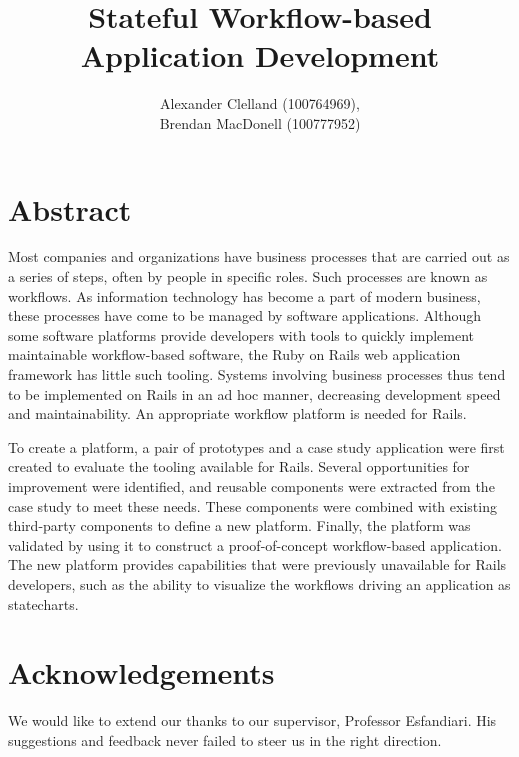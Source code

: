 \documentclass[document.tex]{subfiles}
\begin{document}
\title{Stateful Workflow-based\\Application Development}
\author{
  Alexander Clelland (100764969), \\
  Brendan MacDonell (100777952)
}
\copyrightfalse %

\beforepreface

\chapter*{Abstract}
Most companies and organizations have business processes that are carried out as a series of steps, often by people in specific roles. Such processes are known as workflows. As information technology has become a part of modern business, these processes have come to be managed by software applications. Although some software platforms provide developers with tools to quickly implement maintainable workflow-based software, the Ruby on Rails web application framework has little such tooling. Systems involving business processes thus tend to be implemented on Rails in an ad hoc manner, decreasing development speed and maintainability. An appropriate workflow platform is needed for Rails.

To create a platform, a pair of prototypes and a case study application were first created to evaluate the tooling available for Rails. Several opportunities for improvement were identified, and reusable components were extracted from the case study to meet these needs. These components were combined with existing third-party components to define a new platform. Finally, the platform was validated by using it to construct a proof-of-concept workflow-based application. The new platform provides capabilities that were previously unavailable for Rails developers, such as the ability to visualize the workflows driving an application as statecharts.


\chapter*{Acknowledgements}

We would like to extend our thanks to our supervisor, Professor Esfandiari.
His suggestions and feedback never failed to steer us in the right direction.
\end{document}
